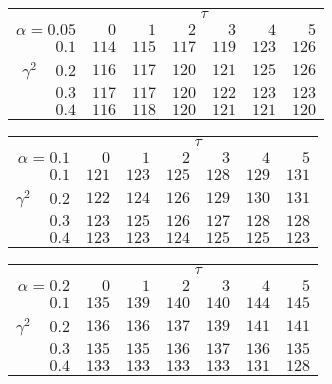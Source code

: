 \begin{tabular}{r|rrrrrr}
\hline\hline
 &\multicolumn{6}{c}{$\tau$} \\ 
 $\alpha = 0.05$ & $0$ & $1$ & $2$ & $3$ & $4$ & $5$ \\ 
 \hline$0.1$ & $114$ & $115$ & $117$ & $119$ & $123$ & $126$\\ 
$\gamma^2\;\;\;$ $0.2$ & $116$ & $117$ & $120$ & $121$ & $125$ & $126$\\ 
$0.3$ & $117$ & $117$ & $120$ & $122$ & $123$ & $123$\\ 
$0.4$ & $116$ & $118$ & $120$ & $121$ & $121$ & $120$\\ 
 \hline 
 \end{tabular}
 
 \vspace{2em} 
 
\begin{tabular}{r|rrrrrr}
\hline\hline
 &\multicolumn{6}{c}{$\tau$} \\ 
 $\alpha = 0.1$ & $0$ & $1$ & $2$ & $3$ & $4$ & $5$ \\ 
 \hline$0.1$ & $121$ & $123$ & $125$ & $128$ & $129$ & $131$\\ 
$\gamma^2\;\;\;$ $0.2$ & $122$ & $124$ & $126$ & $129$ & $130$ & $131$\\ 
$0.3$ & $123$ & $125$ & $126$ & $127$ & $128$ & $128$\\ 
$0.4$ & $123$ & $123$ & $124$ & $125$ & $125$ & $123$\\ 
 \hline 
 \end{tabular}
 
 \vspace{2em} 
 
\begin{tabular}{r|rrrrrr}
\hline\hline
 &\multicolumn{6}{c}{$\tau$} \\ 
 $\alpha = 0.2$ & $0$ & $1$ & $2$ & $3$ & $4$ & $5$ \\ 
 \hline$0.1$ & $135$ & $139$ & $140$ & $140$ & $144$ & $145$\\ 
$\gamma^2\;\;\;$ $0.2$ & $136$ & $136$ & $137$ & $139$ & $141$ & $141$\\ 
$0.3$ & $135$ & $135$ & $136$ & $137$ & $136$ & $135$\\ 
$0.4$ & $133$ & $133$ & $133$ & $133$ & $131$ & $128$\\ 
 \hline 
 \end{tabular}